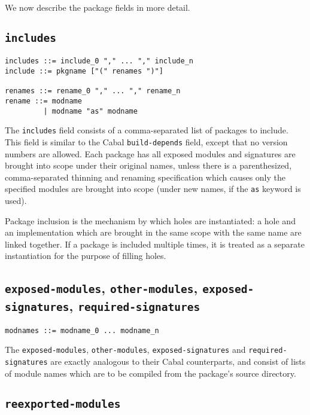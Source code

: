 \documentclass{article}
\begin{document}
We now describe the package fields in more detail.

\subsection{\texttt{includes}}

\begin{verbatim}
includes ::= include_0 "," ... "," include_n
include ::= pkgname ["(" renames ")"]

renames ::= rename_0 "," ... "," rename_n
rename ::= modname
         | modname "as" modname
\end{verbatim}

The \texttt{includes} field consists of a comma-separated list of
packages to include.  This field is similar to the Cabal
\texttt{build-depends} field, except that no version numbers are
allowed.  Each package has all exposed modules and signatures are
brought into scope under their original names, unless there is a
parenthesized, comma-separated thinning and renaming specification which
causes only the specified modules are brought into scope (under new
names, if the \texttt{as} keyword is used).

Package inclusion is the mechanism by which holes are instantiated:
a hole and an implementation which are brought in the same scope with
the same name are linked together.  If a package is included multiple
times, it is treated as a separate instantiation for the purpose of
filling holes.

\subsection{\texttt{exposed-modules}, \texttt{other-modules}, \texttt{exposed-signatures}, \texttt{required-signatures}}

\begin{verbatim}
modnames ::= modname_0 ... modname_n
\end{verbatim}

The \texttt{exposed-modules}, \texttt{other-modules},
\texttt{exposed-signatures} and \texttt{required-signatures} are exactly
analogous to their Cabal counterparts, and consist of lists of module names
which are to be compiled from the package's source directory.

\subsection{\texttt{reexported-modules}}
\end{document}
